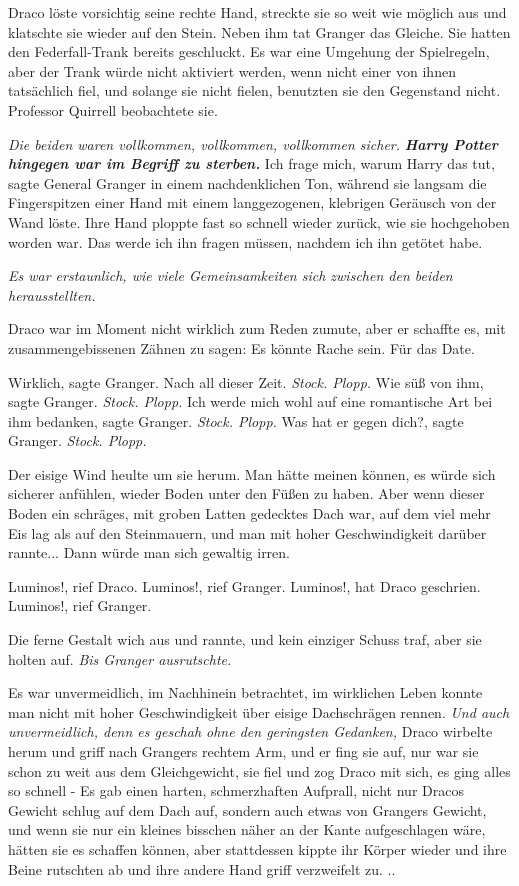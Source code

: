 Draco löste vorsichtig seine rechte Hand, streckte sie so weit wie möglich aus
und klatschte sie wieder auf den Stein. Neben ihm tat Granger das Gleiche. Sie
hatten den Federfall-Trank bereits geschluckt. Es war eine Umgehung der
Spielregeln, aber der Trank würde nicht aktiviert werden, wenn nicht einer von
ihnen tatsächlich fiel, und solange sie nicht fielen, benutzten sie den
Gegenstand nicht. Professor Quirrell beobachtete sie.

\emph{Die beiden waren vollkommen, vollkommen, vollkommen sicher.}
\textbf{\emph{Harry Potter hingegen war im Begriff zu sterben.}}\textbf{} \glqq{}
Ich frage mich, warum Harry das tut\grqq{}, sagte General Granger in einem
nachdenklichen Ton, während sie langsam die Fingerspitzen einer Hand mit einem
langgezogenen, klebrigen Geräusch von der Wand löste. Ihre Hand ploppte fast so
schnell wieder zurück, wie sie hochgehoben worden war. \glqq{}Das werde ich ihn
fragen müssen, nachdem ich ihn getötet habe.\grqq{}

\emph{Es war erstaunlich, wie viele Gemeinsamkeiten sich zwischen den beiden
herausstellten.}

Draco war im Moment nicht wirklich zum Reden zumute, aber er schaffte es, mit
zusammengebissenen Zähnen zu sagen: \glqq{}Es könnte Rache sein. Für das Date.\grqq{}

\glqq{}Wirklich\grqq{}, sagte Granger. \glqq{}Nach all dieser Zeit.\grqq{}
\emph{Stock. Plopp.}
\glqq{}Wie süß von ihm\grqq{}, sagte Granger.
\emph{Stock. Plopp.}
\glqq{}Ich werde mich wohl auf eine romantische Art bei ihm bedanken\grqq{},
sagte Granger.
\emph{Stock. Plopp.}
\glqq{}Was hat er gegen dich?\grqq{}, sagte Granger.
\emph{Stock. Plopp.}

Der eisige Wind heulte um sie herum. Man hätte meinen können, es würde sich
sicherer anfühlen, wieder Boden unter den Füßen zu haben. Aber wenn dieser Boden
ein schräges, mit groben Latten gedecktes Dach war, auf dem viel mehr Eis lag
als auf den Steinmauern, und man mit hoher Geschwindigkeit darüber rannte...
Dann würde man sich gewaltig irren.

\glqq{}Luminos!\grqq{}, rief Draco. \glqq{}Luminos!\grqq{}, rief Granger. \glqq{}
Luminos!\grqq{}, hat Draco geschrien. \glqq{}Luminos!\grqq{}, rief Granger.

Die ferne Gestalt wich aus und rannte, und kein einziger Schuss traf, aber sie
holten auf. \emph{ Bis Granger ausrutschte.}

Es war unvermeidlich, im Nachhinein betrachtet, im wirklichen Leben konnte man
nicht mit hoher Geschwindigkeit über eisige Dachschrägen rennen.
\emph{Und auch unvermeidlich, denn es geschah ohne den geringsten Gedanken,}
Draco wirbelte herum und griff nach Grangers rechtem Arm, und er fing sie auf,
nur war sie schon zu weit aus dem Gleichgewicht, sie fiel und zog Draco mit
sich, es ging alles so schnell - Es gab einen harten, schmerzhaften Aufprall,
nicht nur Dracos Gewicht schlug auf dem Dach auf, sondern auch etwas von
Grangers Gewicht, und wenn sie nur ein kleines bisschen näher an der Kante
aufgeschlagen wäre, hätten sie es schaffen können, aber stattdessen kippte ihr
Körper wieder und ihre Beine rutschten ab und ihre andere Hand griff verzweifelt
zu. ..


